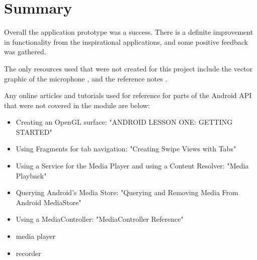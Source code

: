 \documentclass[conference]{acmsiggraph}
\begin{document}
\section{Summary}

Overall the application prototype was a success. There is a definite improvement in functionality from the inspirational applications, and some positive feedback was gathered. 

The only resources used that were not created for this project include the vector graphic of the microphone \cite{microphone}, and the reference notes \cite{refNotes}.

Any online articles and tutorials used for reference for parts of the Android API that were not covered in the module are below:
\begin{itemize}
	\item Creating an OpenGL surface: "ANDROID LESSON ONE: GETTING STARTED" \cite{OpenGL}
	\item Using Fragments for tab navigation: "Creating Swipe Views with Tabs" \cite{swipe}
	\item Using a Service for the Media Player and using a Content Resolver: "Media Playback" \cite{Service}
	\item Querying Android's Media Store: "Querying and Removing Media From Android MediaStore" \cite{MediaStore}
	\item Using a MediaController: "MediaController Reference" \cite{MediaController}
	\item media player
	\item recorder 
\end{itemize}




\end{document}
